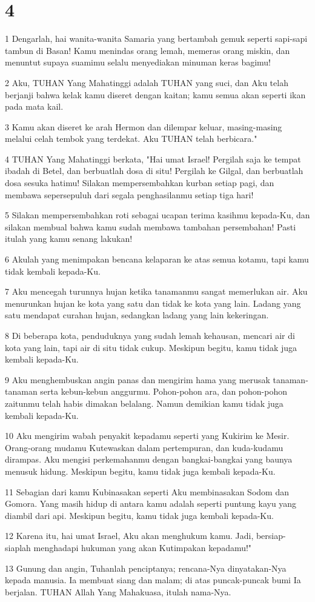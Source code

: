 \chapter{4}

\par 1 Dengarlah, hai wanita-wanita Samaria yang bertambah gemuk seperti sapi-sapi tambun di Basan! Kamu menindas orang lemah, memeras orang miskin, dan menuntut supaya suamimu selalu menyediakan minuman keras bagimu!
\par 2 Aku, TUHAN Yang Mahatinggi adalah TUHAN yang suci, dan Aku telah berjanji bahwa kelak kamu diseret dengan kaitan; kamu semua akan seperti ikan pada mata kail.
\par 3 Kamu akan diseret ke arah Hermon dan dilempar keluar, masing-masing melalui celah tembok yang terdekat. Aku TUHAN telah berbicara."
\par 4 TUHAN Yang Mahatinggi berkata, "Hai umat Israel! Pergilah saja ke tempat ibadah di Betel, dan berbuatlah dosa di situ! Pergilah ke Gilgal, dan berbuatlah dosa sesuka hatimu! Silakan mempersembahkan kurban setiap pagi, dan membawa sepersepuluh dari segala penghasilanmu setiap tiga hari!
\par 5 Silakan mempersembahkan roti sebagai ucapan terima kasihmu kepada-Ku, dan silakan membual bahwa kamu sudah membawa tambahan persembahan! Pasti itulah yang kamu senang lakukan!
\par 6 Akulah yang menimpakan bencana kelaparan ke atas semua kotamu, tapi kamu tidak kembali kepada-Ku.
\par 7 Aku mencegah turunnya hujan ketika tanamanmu sangat memerlukan air. Aku menurunkan hujan ke kota yang satu dan tidak ke kota yang lain. Ladang yang satu mendapat curahan hujan, sedangkan ladang yang lain kekeringan.
\par 8 Di beberapa kota, penduduknya yang sudah lemah kehausan, mencari air di kota yang lain, tapi air di situ tidak cukup. Meskipun begitu, kamu tidak juga kembali kepada-Ku.
\par 9 Aku menghembuskan angin panas dan mengirim hama yang merusak tanaman-tanaman serta kebun-kebun anggurmu. Pohon-pohon ara, dan pohon-pohon zaitunmu telah habis dimakan belalang. Namun demikian kamu tidak juga kembali kepada-Ku.
\par 10 Aku mengirim wabah penyakit kepadamu seperti yang Kukirim ke Mesir. Orang-orang mudamu Kutewaskan dalam pertempuran, dan kuda-kudamu dirampas. Aku mengisi perkemahanmu dengan bangkai-bangkai yang baunya menusuk hidung. Meskipun begitu, kamu tidak juga kembali kepada-Ku.
\par 11 Sebagian dari kamu Kubinasakan seperti Aku membinasakan Sodom dan Gomora. Yang masih hidup di antara kamu adalah seperti puntung kayu yang diambil dari api. Meskipun begitu, kamu tidak juga kembali kepada-Ku.
\par 12 Karena itu, hai umat Israel, Aku akan menghukum kamu. Jadi, bersiap-siaplah menghadapi hukuman yang akan Kutimpakan kepadamu!"
\par 13 Gunung dan angin, Tuhanlah penciptanya; rencana-Nya dinyatakan-Nya kepada manusia. Ia membuat siang dan malam; di atas puncak-puncak bumi Ia berjalan. TUHAN Allah Yang Mahakuasa, itulah nama-Nya.

